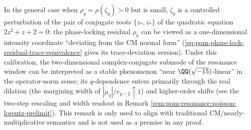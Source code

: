 \begin{remark}\label{rem:pom-near-cm-stable-perturbation}
In the general case when \(\rho_q=\rho(\zeta_q)>0\) but is small, \(\zeta_q\) is a controlled perturbation of the pair of conjugate roots \(\{z_\ast,\overline{z_\ast}\}\) of the quadratic equation \(2z^2+z+2=0\): the phase-locking residual \(\rho_q\) can be viewed as a one-dimensional intensity coordinate ``deviating from the CM normal form'' (\eqref{eq:pom-phase-lock-residual-trace-equivalence} gives its trace-deviation version).
Under this calibration, the two-dimensional complex-conjugate submode of the resonance window can be interpreted as a stable phenomenon ``near \(\QQ(\sqrt{-15})\)-linear'' in the operator-norm sense; its \(q\)-dependence enters primarily through the real dilation (the margining width of \(|\mu_q|/r_{q-2}\uparrow 1\)) and higher-order shifts (see the two-step rescaling and width readout in Remark \ref{rem:pom-resonance-poisson-lorentz-prelimit}).
This remark is only used to align with traditional CM/nearly-multiplicative semantics and is not used as a premise in any proof.
\end{remark}

